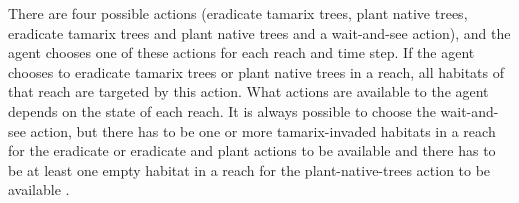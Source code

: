 There are four possible actions (eradicate tamarix trees, plant native trees,
eradicate tamarix trees and plant native trees and a wait-and-see action),
and the agent chooses one of these actions for each reach and time step. If the 
agent chooses to eradicate tamarix trees or plant native trees in a reach, 
all habitats of that reach are targeted by this action. What
actions are available to the agent depends on the state of each reach. It is
always possible to choose the wait-and-see action, but there has to be one
or more tamarix-invaded habitats in a reach for the eradicate or eradicate and
plant actions to be available and there has to be at least one empty habitat in
a reach for the plant-native-trees action to be available
\parencite{invasiveSpecis2014:Online}.  
